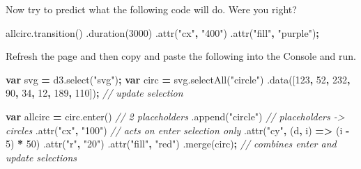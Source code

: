 \documentclass[openany]{book}
\newenvironment{Shaded}{\begin{snugshade}}{\end{snugshade}}
\newcommand{\AttributeTok}[1]{\textcolor[rgb]{0.77,0.63,0.00}{#1}}
\newcommand{\CommentTok}[1]{\textcolor[rgb]{0.56,0.35,0.01}{\textit{#1}}}
\newcommand{\DecValTok}[1]{\textcolor[rgb]{0.00,0.00,0.81}{#1}}
\newcommand{\KeywordTok}[1]{\textcolor[rgb]{0.13,0.29,0.53}{\textbf{#1}}}
\newcommand{\NormalTok}[1]{#1}
\newcommand{\OperatorTok}[1]{\textcolor[rgb]{0.81,0.36,0.00}{\textbf{#1}}}
\newcommand{\StringTok}[1]{\textcolor[rgb]{0.31,0.60,0.02}{#1}}
\newcommand{\VariableTok}[1]{\textcolor[rgb]{0.00,0.00,0.00}{#1}}
\begin{document}
Now try to predict what the following code will do. Were you right?

\begin{Shaded}
\begin{Highlighting}[]
\VariableTok{allcirc}\NormalTok{.}\AttributeTok{transition}\NormalTok{() }
\NormalTok{        .}\AttributeTok{duration}\NormalTok{(}\DecValTok{3000}\NormalTok{)}
\NormalTok{        .}\AttributeTok{attr}\NormalTok{(}\StringTok{"cx"}\OperatorTok{,} \StringTok{"400"}\NormalTok{)}
\NormalTok{        .}\AttributeTok{attr}\NormalTok{(}\StringTok{"fill"}\OperatorTok{,} \StringTok{"purple"}\NormalTok{)}\OperatorTok{;}
\end{Highlighting}
\end{Shaded}

Refresh the page and then copy and paste the following into the Console and run.

\begin{Shaded}
\begin{Highlighting}[]
\KeywordTok{var}\NormalTok{ svg }\OperatorTok{=} \VariableTok{d3}\NormalTok{.}\AttributeTok{select}\NormalTok{(}\StringTok{"svg"}\NormalTok{)}\OperatorTok{;}
\KeywordTok{var}\NormalTok{ circ }\OperatorTok{=} \VariableTok{svg}\NormalTok{.}\AttributeTok{selectAll}\NormalTok{(}\StringTok{"circle"}\NormalTok{)}
\NormalTok{  .}\AttributeTok{data}\NormalTok{([}\DecValTok{123}\OperatorTok{,} \DecValTok{52}\OperatorTok{,} \DecValTok{232}\OperatorTok{,} \DecValTok{90}\OperatorTok{,} \DecValTok{34}\OperatorTok{,} \DecValTok{12}\OperatorTok{,} \DecValTok{189}\OperatorTok{,} \DecValTok{110}\NormalTok{])}\OperatorTok{;} \CommentTok{// update selection}
  
\KeywordTok{var}\NormalTok{ allcirc }\OperatorTok{=} \VariableTok{circ}\NormalTok{.}\AttributeTok{enter}\NormalTok{()  }\CommentTok{// 2 placeholders}
\NormalTok{        .}\AttributeTok{append}\NormalTok{(}\StringTok{"circle"}\NormalTok{)  }\CommentTok{// placeholders -> circles}
\NormalTok{          .}\AttributeTok{attr}\NormalTok{(}\StringTok{"cx"}\OperatorTok{,} \StringTok{"100"}\NormalTok{)  }\CommentTok{// acts on enter selection only}
\NormalTok{          .}\AttributeTok{attr}\NormalTok{(}\StringTok{"cy"}\OperatorTok{,}\NormalTok{ (d}\OperatorTok{,}\NormalTok{ i) }\OperatorTok{=>}\NormalTok{ (i }\OperatorTok{-} \DecValTok{5}\NormalTok{) }\OperatorTok{*} \DecValTok{50}\NormalTok{)}
\NormalTok{          .}\AttributeTok{attr}\NormalTok{(}\StringTok{"r"}\OperatorTok{,} \StringTok{"20"}\NormalTok{)}
\NormalTok{          .}\AttributeTok{attr}\NormalTok{(}\StringTok{"fill"}\OperatorTok{,} \StringTok{"red"}\NormalTok{)}
\NormalTok{          .}\AttributeTok{merge}\NormalTok{(circ)}\OperatorTok{;}  \CommentTok{// combines enter and update selections}
\end{Highlighting}
\end{Shaded}
\end{document}
